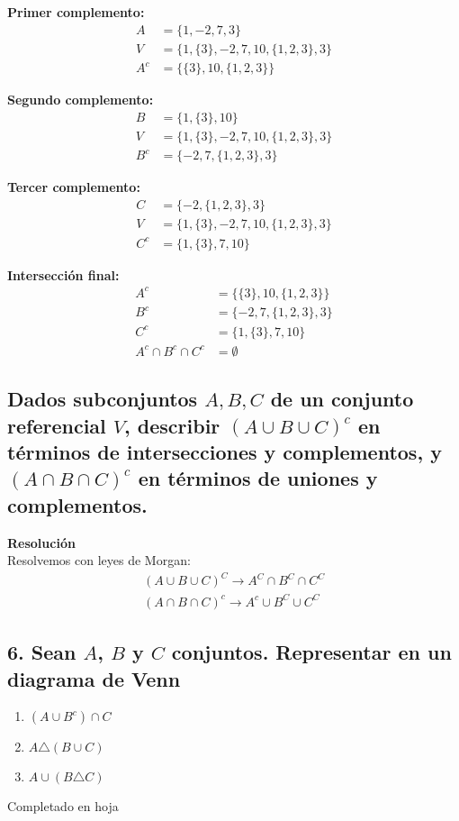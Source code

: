 \documentclass{article}
\begin{document}
\begin{enumerate}[label=\roman*)]
    \textbf{Primer complemento:}
    \begin{align*}
        A &= \{1,-2,7,3\}\\
        V &= \{1, \{3\}, -2, 7, 10, \{1,2,3\},3\}\\
        A^{c} &= \{\{3\}, 10, \{1,2,3\}\} 
    \end{align*}
    
    \textbf{Segundo complemento:}
    \begin{align*}
        B &= \{1,\{3\}, 10\}\\
        V &= \{1, \{3\}, -2, 7, 10, \{1,2,3\},3\}\\
        B^{c} &= \{-2, 7, \{1,2,3\}, 3\}
    \end{align*}
    
    \textbf{Tercer complemento:}
    \begin{align*}
        C &= \{-2, \{1,2,3\}, 3\}\\
        V &= \{1, \{3\}, -2, 7, 10, \{1,2,3\}, 3\}\\
        C^{c} &= \{1, \{3\}, 7, 10\}
    \end{align*}

    \textbf{Intersección final:}
    \begin{align*}
        A^{c} &= \{\{3\}, 10, \{1,2,3\}\}\\
        B^{c} &= \{-2, 7, \{1,2,3\}, 3\}\\
        C^{c} &= \{1, \{3\}, 7, 10\}\\
        A^{c} \cap B^{c} \cap C^{c} &= \emptyset
    \end{align*}
\end{enumerate}

\subsection{Dados subconjuntos $A, B, C$ de un conjunto referencial $V$, describir 
$(A \cup B \cup C)^{c}$ en términos de intersecciones y complementos, 
y $(A \cap B \cap C)^{c}$ en términos de uniones y complementos.}

\textbf{Resolución}\\[6pt]
Resolvemos con leyes de Morgan: 
\begin{align*}
    (A \cup B \cup C)^{C} \rightarrow A^{C} \cap B^{C} \cap C^{C} \\
    (A \cap B \cap C)^{c}\rightarrow A^{c} \cup B^{C} \cup C^{C}
\end{align*}

\subsection*{6. Sean $A$, $B$ y $C$ conjuntos. Representar en un diagrama de Venn}

\begin{multicols}{3}
\begin{enumerate}[label=\roman*)]
    \item $(A \cup B^{c}) \cap C$
    \item $A \triangle (B \cup C)$
    \item $A \cup (B \triangle C)$
\end{enumerate}
\end{multicols}

Completado en hoja
\end{document}
